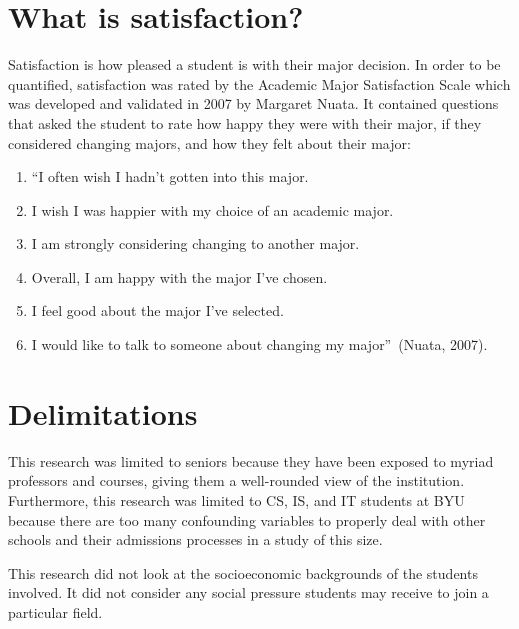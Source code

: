 \section{What is satisfaction?}
Satisfaction is how pleased a student is with their major decision. In order to be quantified, satisfaction was rated by the Academic Major Satisfaction Scale which was developed and validated in 2007 by Margaret Nuata. It contained questions that asked the student to rate how happy they were with their major, if they considered changing majors, and how they felt about their major:
\begin{enumerate}
  \item ``I often wish I hadn't gotten into this major.
  \item I wish I was happier with my choice of an academic major.
  \item I am strongly considering changing to another major.
  \item Overall, I am happy with the major I've chosen.
  \item I feel good about the major I've selected.
  \item I would like to talk to someone about changing my major''~(Nuata, 2007).
\end{enumerate}

\section{Delimitations}
This research was limited to seniors because they have been exposed to myriad professors and courses, giving them a well-rounded view of the institution. Furthermore, this research was limited to CS, IS, and IT students at BYU because there are too many confounding variables to properly deal with other schools and their admissions processes in a study of this size.

This research did not look at the socioeconomic backgrounds of the students involved. It did not consider any social pressure students may receive to join a particular field.
